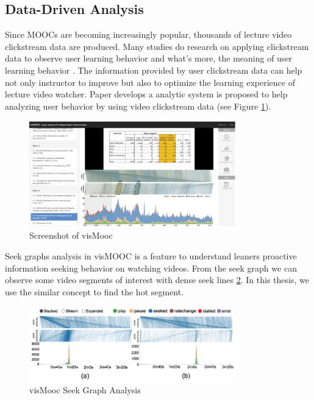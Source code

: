 \subsection{Data-Driven Analysis}
Since MOOCs are becoming increasingly popular, thousands of lecture video clickstream data are produced.
Many studies do research on applying clickstream data to observe user learning behavior and what's more, the meaning of user learning behavior \cite{linan2015}.
The information provided by user clickstream data can help not only instructor to improve but also to optimize the learning experience of lecture video watcher.
Paper \cite{Conglei2015} develops a analytic system is proposed to help analyzing user behavior by using video clickstream data (see Figure \ref{fig:vismooc}).

\begin{figure}[H]
    \centering
    \includegraphics[width = 0.8\textwidth]{fig/vismooc.eps}
    \caption{Screenshot of visMooc}
    \label{fig:vismooc}
\end{figure}

Seek graphs analysis in visMOOC is a feature to understand leaners proactive information seeking behavior on watching videos.
From the seek graph we can observe some video segments of interest with dense seek lines \ref{fig:vismoocseek}.
In this thesis, we use the similar concept to find the hot segment.

\begin{figure}[H]
    \centering
    \includegraphics[width = 0.8\textwidth]{fig/vismoocseek.eps}
    \caption{visMooc Seek Graph Analysis}
    \label{fig:vismoocseek}
\end{figure}
